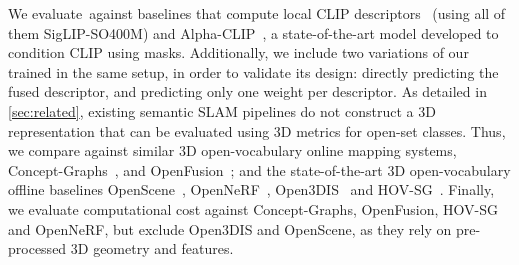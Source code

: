 We evaluate~\clipours against baselines that compute local CLIP descriptors~\cite{conceptfusion, gu2024conceptgraphs,hovsg} (using all of them SigLIP-SO400M) and Alpha-CLIP~\cite{sun2024alpha}, a state-of-the-art model developed to condition CLIP using masks.
{Additionally, we include two variations of our \clipours trained in the same setup, in order to validate its design: directly predicting the fused descriptor, and predicting only one weight per descriptor.} 
As detailed in \cref{sec:related}, existing semantic SLAM pipelines do not construct a 3D representation that can be evaluated using 3D metrics for open-set classes. 
Thus, we compare \ours against similar 3D open-vocabulary online mapping systems, Concept-Graphs~\cite{gu2024conceptgraphs}, and OpenFusion~\cite{yamazaki2024open}; and the state-of-the-art 3D open-vocabulary offline baselines OpenScene~\cite{Peng2023OpenScene}, OpenNeRF~\cite{engelmann2024opennerf}, Open3DIS~\cite{nguyen2024open3dis} and HOV-SG~\cite{hovsg}.
Finally, we evaluate computational cost against Concept-Graphs, OpenFusion, HOV-SG and OpenNeRF, but exclude Open3DIS and OpenScene, as they rely on pre-processed 3D geometry and features.

